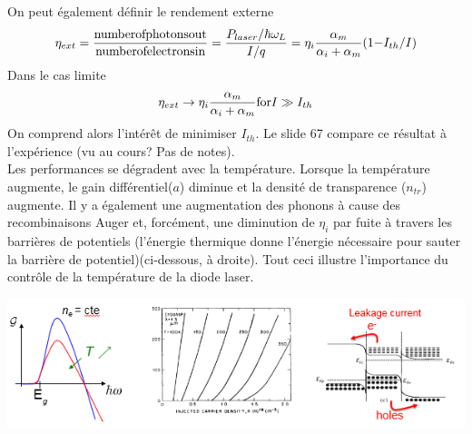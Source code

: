 	On peut également définir le rendement externe
	\begin{equation}
	{\eta _{ext}} = \frac{{{\rm{number of photons out}}}}{{{\rm{number of electrons in}}}} =
	\frac{{{P_{laser}}/\hbar {\omega _L}}}{{{I}/q}} = {\eta _i}\frac{{{\alpha _m}}}{{{\alpha _i}
	+ {\alpha _m}}}(1{ - }{{I}_{th}}/{I})
	\end{equation}
	Dans le cas limite
	\begin{equation}
	{\eta _{ext}} \to {\rm{ }}{\eta _i}\frac{{{\alpha _m}}}{{{\alpha _i} + {\alpha _m}}}{\rm{  for   
	 }}{I} \gg {{I}_{th}}
	\end{equation}
	On comprend alors l'intérêt de minimiser $I_{th}$. Le slide 67 compare ce résultat à l'expérience
	(vu au cours? Pas de notes).\\
	
	Les performances se dégradent avec la température. Lorsque la température augmente, le 
	gain différentiel($a$) diminue et la densité de transparence ($n_{tr}$) augmente. Il y a 
	également une augmentation des phonons à cause des recombinaisons Auger et, forcément, une 
	diminution de $\eta_i$ par fuite à travers les barrières de potentiels (l'énergie thermique 
	donne l'énergie nécessaire pour sauter la barrière de potentiel)(ci-dessous, à droite). 
	Tout ceci illustre l'importance du contrôle de la température de la diode laser.
	\begin{center}
	\includegraphics[scale=0.6]{ch5/image52}
	\end{center}
	
\newpage
